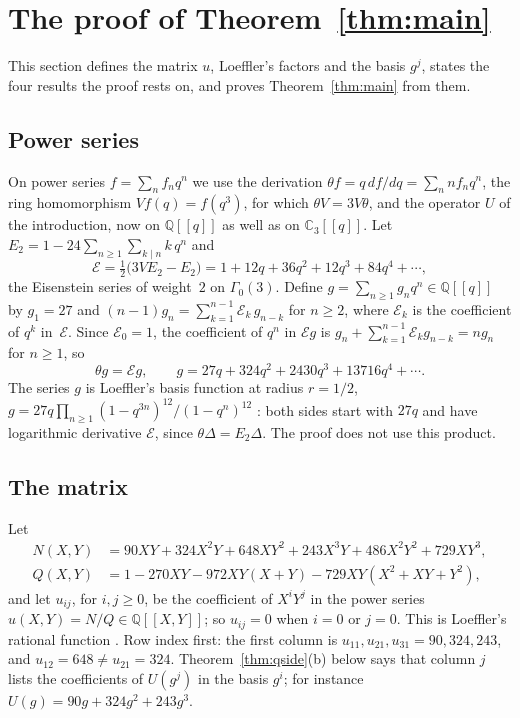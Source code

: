 \documentclass[11pt]{amsart}
\theoremstyle{definition}
\numberwithin{equation}{section}
\newcommand{\Q}{\mathbb{Q}}
\newcommand{\Cp}{\mathbb{C}_3}
\newcommand{\cE}{\mathcal{E}}
\begin{document}
\section{The proof of Theorem~\ref{thm:main}}\label{sec:assembly}

This section defines the matrix $u$, Loeffler's factors and the basis $g^j$, states the four results the proof rests on, and proves Theorem~\ref{thm:main} from them.

\subsection*{Power series}
On power series $f=\sum_nf_nq^n$ we use the derivation $\theta f=q\,df/dq=\sum_n nf_nq^n$, the ring homomorphism $Vf(q)=f(q^3)$, for which $\theta V=3V\theta$, and the operator $U$ of the introduction, now on $\Q[[q]]$ as well as on $\Cp[[q]]$. Let $E_2=1-24\sum_{n\ge1}\sum_{k\mid n}k\,q^n$ and
\[
\cE=\tfrac12\bigl(3VE_2-E_2\bigr)=1+12q+36q^2+12q^3+84q^4+\cdots,
\]
the Eisenstein series of weight~$2$ on $\Gamma_0(3)$. Define $g=\sum_{n\ge1}g_nq^n\in\Q[[q]]$ by $g_1=27$ and $(n-1)g_n=\sum_{k=1}^{n-1}\cE_k\,g_{n-k}$ for $n\ge2$, where $\cE_k$ is the coefficient of $q^k$ in~$\cE$. Since $\cE_0=1$, the coefficient of $q^n$ in $\cE g$ is $g_n+\sum_{k=1}^{n-1}\cE_kg_{n-k}=ng_n$ for $n\ge1$, so
\begin{equation}\label{eq:gode}
\theta g=\cE g,\qquad g=27q+324q^2+2430q^3+13716q^4+\cdots.
\end{equation} The series $g$ is Loeffler's basis function at radius $r=1/2$, $g=27q\prod_{n\ge1}(1-q^{3n})^{12}/(1-q^n)^{12}$ \cite[\S1]{Loe08}: both sides start with $27q$ and have logarithmic derivative $\cE$, since $\theta\Delta=E_2\Delta$. The proof does not use this product.

\subsection*{The matrix}
Let
\begin{align*}
N(X,Y)&=90XY+324X^2Y+648XY^2+243X^3Y+486X^2Y^2+729XY^3,\\
Q(X,Y)&=1-270XY-972XY(X+Y)-729XY(X^2+XY+Y^2),
\end{align*}
and let $u_{ij}$, for $i,j\ge0$, be the coefficient of $X^iY^j$ in the power series $u(X,Y)=N/Q\in\Q[[X,Y]]$; so $u_{ij}=0$ when $i=0$ or $j=0$. This is Loeffler's rational function \cite[\S2]{Loe08}. Row index first: the first column is $u_{11},u_{21},u_{31}=90,324,243$, and $u_{12}=648\ne u_{21}=324$. Theorem~\ref{thm:qside}(b) below says that column $j$ lists the coefficients of $U(g^j)$ in the basis $g^i$; for instance $U(g)=90g+324g^2+243g^3$.
\end{document}
